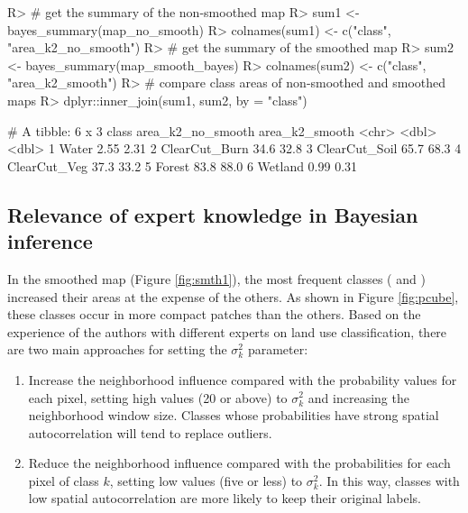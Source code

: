 \documentclass[
  shortnames]{jss}
\begin{document}
\begin{CodeChunk}
\begin{CodeInput}
R> # get the summary of the non-smoothed map
R> sum1 <- bayes_summary(map_no_smooth)
R> colnames(sum1) <- c("class", "area_k2_no_smooth")
R> # get the summary of the smoothed map
R> sum2 <- bayes_summary(map_smooth_bayes)
R> colnames(sum2) <- c("class", "area_k2_smooth")
R> # compare class areas of non-smoothed and smoothed maps
R> dplyr::inner_join(sum1, sum2, by = "class")
\end{CodeInput}
\begin{CodeOutput}
# A tibble: 6 x 3
  class         area_k2_no_smooth area_k2_smooth
  <chr>                     <dbl>          <dbl>
1 Water                      2.55           2.31
2 ClearCut_Burn             34.6           32.8 
3 ClearCut_Soil             65.7           68.3 
4 ClearCut_Veg              37.3           33.2 
5 Forest                    83.8           88.0 
6 Wetland                    0.99           0.31
\end{CodeOutput}
\end{CodeChunk}

\hypertarget{relevance-of-expert-knowledge-in-bayesian-inference}{%
\subsection{Relevance of expert knowledge in Bayesian inference}\label{relevance-of-expert-knowledge-in-bayesian-inference}}

In the smoothed map (Figure \ref{fig:smth1}), the most frequent classes ( and ) increased their areas at the expense of the others. As shown in Figure \ref{fig:pcube}, these classes occur in more compact patches than the others. Based on the experience of the authors with different experts on land use classification, there are two main approaches for setting the \(\sigma^2_{k}\) parameter:

\begin{enumerate}
\def\labelenumi{\arabic{enumi}.}
\item
  Increase the neighborhood influence compared with the probability values for each pixel, setting high values (20 or above) to \(\sigma^2_{k}\) and increasing the neighborhood window size. Classes whose probabilities have strong spatial autocorrelation will tend to replace outliers.
\item
  Reduce the neighborhood influence compared with the probabilities for each pixel of class \(k\), setting low values (five or less) to \(\sigma^2_{k}\). In this way, classes with low spatial autocorrelation are more likely to keep their original labels.
\end{enumerate}
\end{document}
